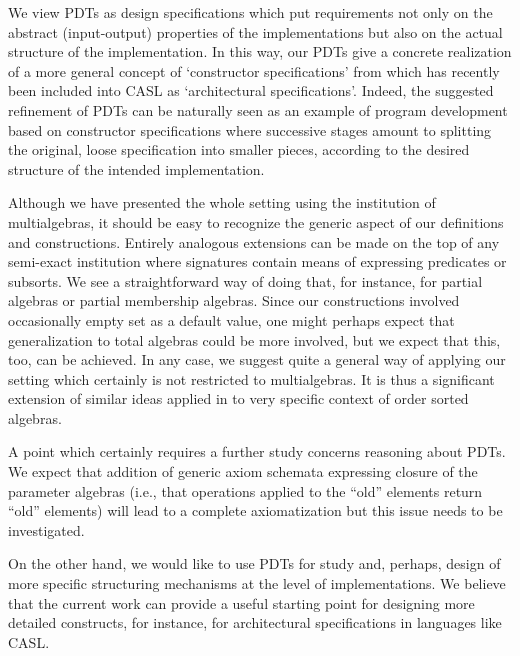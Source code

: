 We view PDTs as design
specifications which put requirements not only on the abstract (input-output)
properties of the implementations but also on the actual structure of the
implementation. In this way, our PDTs give a concrete realization of a more
general concept of `constructor specifications' from \cite{para1} which has
recently been included into CASL \cite{CASL} as `architectural
specifications'. Indeed, the suggested refinement of PDTs can be naturally seen as an
example of program development based on constructor specifications where
successive stages amount to splitting the original, loose specification into
smaller pieces, 
according to the desired structure of the intended implementation.

Although we have presented the whole setting using the institution of multialgebras, it should
be easy to recognize the generic aspect of our definitions and
constructions. Entirely analogous extensions can be made on the top of any
semi-exact institution where signatures contain means of expressing predicates or
subsorts. We see a straightforward way of doing that, for instance, for
partial algebras or partial membership algebras. Since our constructions
involved occasionally empty set as a default value, one might perhaps expect
that generalization to total algebras could be more involved, but we expect
that this, too, can be achieved.
In any case, we suggest quite a general way of applying our setting which
certainly is not restricted to multialgebras. It is thus a significant
extension of similar ideas applied in \cite{paramPoigne} to 
very specific context of order sorted algebras.

A point which certainly requires a further study concerns reasoning about
PDTs. We expect that addition of generic axiom schemata expressing closure of the
parameter algebras (i.e., that operations applied to the ``old'' elements
return ``old'' elements) will lead to a complete axiomatization but this issue
needs to be investigated.

On the other hand, we would like to use PDTs for study and, perhaps, design
of more specific structuring mechanisms at the level of implementations.
We believe that the current work can provide a useful starting point for designing more
detailed constructs, for instance, for architectural specifications in languages like CASL.









